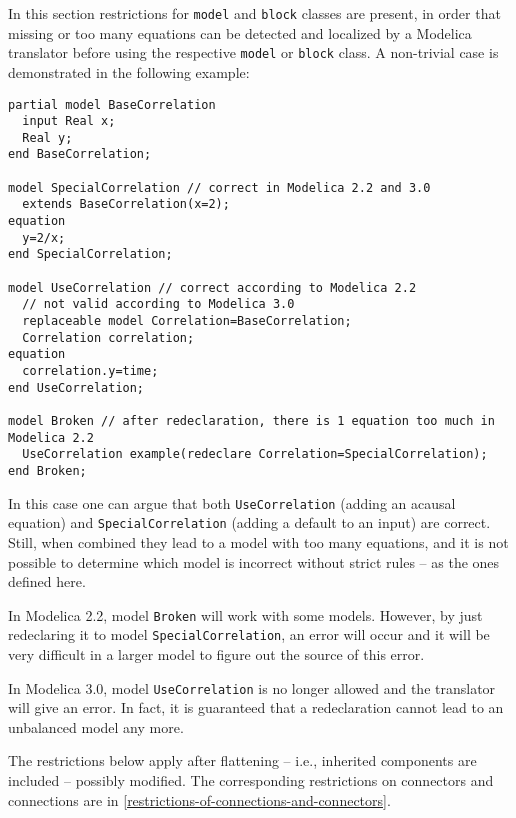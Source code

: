\begin{nonnormative}
In this section restrictions for \lstinline!model! and \lstinline!block! classes are present, in order that missing or too many equations can be detected and localized by a Modelica translator before using the respective \lstinline!model! or \lstinline!block! class.  A non-trivial case is demonstrated in the following example:
\begin{lstlisting}[language=modelica]
partial model BaseCorrelation
  input Real x;
  Real y;
end BaseCorrelation;

model SpecialCorrelation // correct in Modelica 2.2 and 3.0
  extends BaseCorrelation(x=2);
equation
  y=2/x;
end SpecialCorrelation;

model UseCorrelation // correct according to Modelica 2.2
  // not valid according to Modelica 3.0
  replaceable model Correlation=BaseCorrelation;
  Correlation correlation;
equation
  correlation.y=time;
end UseCorrelation;

model Broken // after redeclaration, there is 1 equation too much in Modelica 2.2
  UseCorrelation example(redeclare Correlation=SpecialCorrelation);
end Broken;
\end{lstlisting}

In this case one can argue that both \lstinline!UseCorrelation! (adding an acausal equation) and \lstinline!SpecialCorrelation! (adding a default to an input) are correct.  Still, when combined they
lead to a model with too many equations, and it is not possible to determine which model is incorrect without strict rules -- as the ones defined here.

In Modelica 2.2, model \lstinline!Broken! will work with some models.
However, by just redeclaring it to model \lstinline!SpecialCorrelation!, an
error will occur and it will be very difficult in a larger model to
figure out the source of this error.

In Modelica 3.0, model \lstinline!UseCorrelation! is no longer allowed
and the translator will give an error. In fact, it is guaranteed that a
redeclaration cannot lead to an unbalanced model any more.
\end{nonnormative}

The restrictions below apply after flattening -- i.e., inherited components are included -- possibly modified.  The corresponding restrictions on connectors and connections are in
\cref{restrictions-of-connections-and-connectors}.

